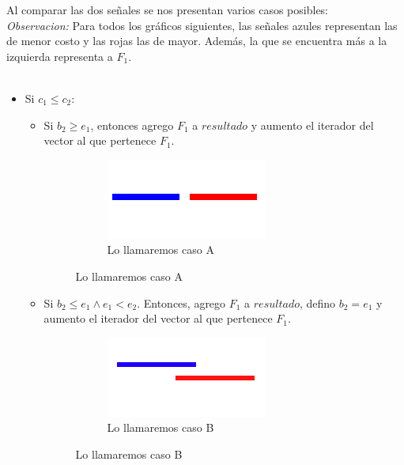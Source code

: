 Al comparar las dos señales se nos presentan varios casos posibles:\\

\textit{Observacion:} Para todos los gráficos siguientes, las señales azules representan las de menor costo y las rojas las de mayor. Además, la que se encuentra más a la izquierda representa a $F_{1}$. \\
\\

\begin{itemize}
	\item Si $c_{1} \leq c_{2}$:
        \begin{itemize}
            \item Si $b_{2} \geq e_{1}$, entonces agrego $F_{1}$ a $resultado$ y aumento el iterador del vector al que pertenece $F_{1}$.
            \begin{figure}[H]
        		\centering
				\begin{subfigure}[b]{0.25\textwidth}
                	\includegraphics[width=\textwidth]{imagenes/ej2-a.jpg}
                	\caption*{Lo llamaremos caso A}
        		\end{subfigure}%
			\end{figure}
            \item Si $b_{2} \leq e_{1} \land e_{1} < e_{2}$. Entonces, agrego $F_{1}$ a $resultado$, defino $b_{2} = e_{1}$ y aumento el iterador del vector al que pertenece $F_{1}$.

            \begin{figure}[H]
        	\centering
				\begin{subfigure}[b]{0.25\textwidth}
                	\includegraphics[width=\textwidth]{imagenes/ej2-b2.jpg}
                	\caption*{Lo llamaremos caso B}
        		\end{subfigure}%


\end{figure}
\end{itemize}
\end{itemize}
